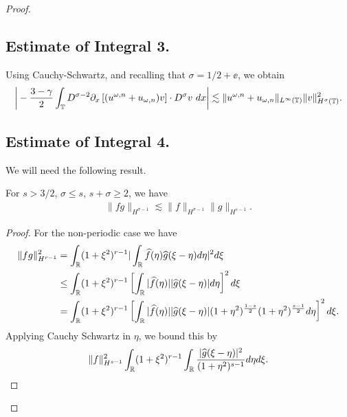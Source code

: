 \begin{proof}
\subsection*{Estimate of Integral 3.} Using Cauchy-Schwartz, and recalling that
$\sigma = 1/2 + \ee$,  we obtain
%
%
\begin{equation}
\begin{split}
\bigg | -\frac{3-\gamma}{2} \int_{\mathbb{T}} D^{\sigma -2} \partial_x \left[
(u^{\omega,n} + u_{\omega,n})v \right]
\cdot D^\sigma v \ dx \bigg |
\lesssim \|u^{\omega,n} + u_{\omega,n} \|_{L^\infty(\mathbb{T})} 
\|v\|_{H^\sigma(\mathbb{T})}^2.
\label{9}
\end{split}
\end{equation}
%
%
%
\subsection*{Estimate of Integral 4.}
We will need the following result.
%
\begin{lemma}
For $s > 3/2$, $\sigma \le s$, $s + \sigma \ge 2$, we have
%
%
\begin{equation}
\label{11}
\begin{split}
  \| fg \|_{H^{\sigma-1}} \lesssim \| f \|_{H^{\sigma-1}} \| g \|_{H^{s-1}}.
\end{split}
\end{equation}
%
%
\end{lemma}
%
%
\begin{proof}
For the non-periodic case we have
%
%
\begin{equation*}
\begin{split}
  \| fg\|_{H^{r-1}}^{2}
  & = \int_{\mathbb{R}} (1 + \xi^{2})^{r-1}| \int_{\mathbb{R}}
  \widehat{f}(\eta) \widehat{g}( \xi - \eta) d \eta |^{2} d \xi
  \\
  & \le \int_{\mathbb{R}} (1 + \xi^{2})^{r-1}\left [ \int_{\mathbb{R}}
  | \widehat{f}(\eta) |  | \widehat{g}(\xi - \eta) | 
  d \eta \right ]^{2} d \xi
  \\
  & = \int_{\mathbb{R}}  (1 + \xi^{2})^{r-1}\left [ \int_{\mathbb{R}}
  | \widehat{f}(\eta) |  | \widehat{g}(\xi - \eta) | (1 +
  \eta^{2})^{\frac{1-s}{2}} (1 + \eta^{2})^{\frac{s-1}{2}}
  d \eta \right ]^{2} d \xi.
  \end{split}
\end{equation*}
%
Applying Cauchy Schwartz in $\eta$, we bound this by
%
%
%
\begin{equation}
  \label{np-key-term}
\begin{split}
  \| f \|_{H^{s-1}}^{2} \int_{\rr}  (1 + \xi^{2})^{r-1}\int_{\rr} \frac{|
  \wh{g}(\xi - \eta) |^{2}}{(1 + \eta^{2})^{s-1}} d \eta d \xi.

\end{split}
\end{equation}
\end{proof}
\end{proof}
